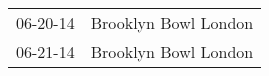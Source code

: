 \begin{supertabular}{p{0.07\textwidth}p{0.23\textwidth}}
 06-20-14 &  Brooklyn Bowl London \\
 06-21-14 &  Brooklyn Bowl London \\
\end{supertabular}
